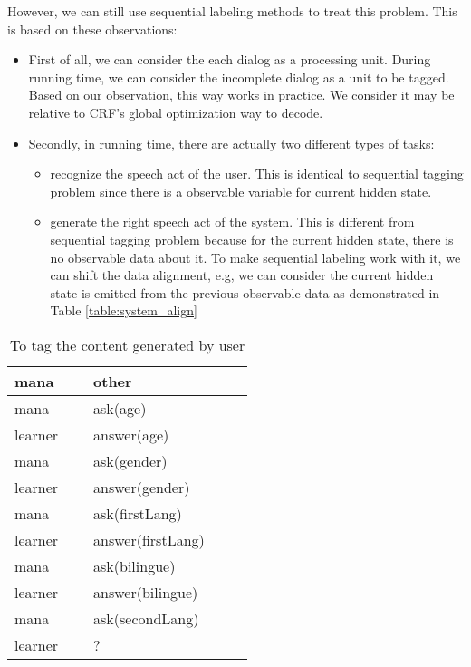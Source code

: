 \documentclass[a4paper]{article}
\begin{document}
However, we can still use sequential labeling methods to treat this problem. This is based on these observations:
\begin{itemize}
    \item First of all, we can consider the each dialog as a processing unit. During running time, we can consider the incomplete dialog as a unit to be tagged. Based on our observation, this way works in practice. We consider it may be relative to CRF's global optimization way to decode. 
    \item Secondly, in running time, there are actually two different types of tasks:
        \begin{itemize}
            \item recognize the speech act of the user. This is identical to sequential tagging problem since there is a observable variable for current hidden state.
            \item generate the right speech act of the system. This is different from sequential tagging problem because for the current hidden state, there is no observable data about it. To make sequential labeling work with it, we can shift the data alignment, e.g, we can consider the current hidden state is emitted from the previous observable data as demonstrated in Table \ref{table:system_align} 
        \end{itemize}
\end{itemize}

\begin{table}
    \begin{tabular}{|l|l|}
        \hline
        mana    & other              \\ \hline
        mana    & ask(age)           \\ \hline
        learner & answer(age)        \\ \hline
        mana    & ask(gender)        \\ \hline
        learner & answer(gender)     \\ \hline
        mana    & ask(firstLang)     \\ \hline
        learner & answer(firstLang)  \\ \hline
        mana    & ask(bilingue)      \\ \hline
        learner & answer(bilingue)   \\ \hline
        mana    & ask(secondLang)    \\ \hline
        learner & ?                  \\ \hline
    \end{tabular}
    \caption{To tag the content generated by user}
    \label{table:user_align}
\end{table}
\end{document}
